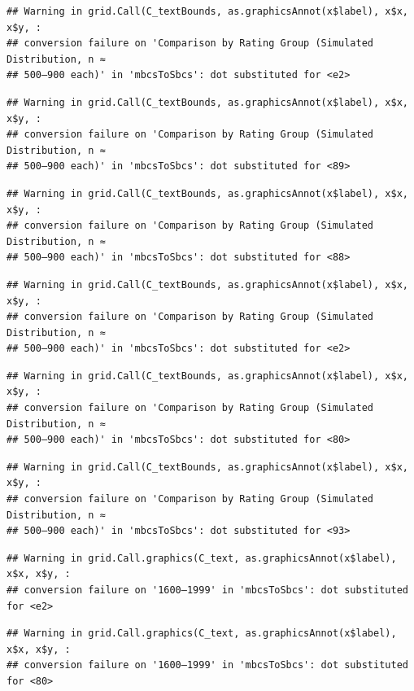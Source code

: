 \documentclass[
]{article}
\begin{document}
\begin{verbatim}
## Warning in grid.Call(C_textBounds, as.graphicsAnnot(x$label), x$x, x$y, :
## conversion failure on 'Comparison by Rating Group (Simulated Distribution, n ≈
## 500–900 each)' in 'mbcsToSbcs': dot substituted for <e2>
\end{verbatim}

\begin{verbatim}
## Warning in grid.Call(C_textBounds, as.graphicsAnnot(x$label), x$x, x$y, :
## conversion failure on 'Comparison by Rating Group (Simulated Distribution, n ≈
## 500–900 each)' in 'mbcsToSbcs': dot substituted for <89>
\end{verbatim}

\begin{verbatim}
## Warning in grid.Call(C_textBounds, as.graphicsAnnot(x$label), x$x, x$y, :
## conversion failure on 'Comparison by Rating Group (Simulated Distribution, n ≈
## 500–900 each)' in 'mbcsToSbcs': dot substituted for <88>
\end{verbatim}

\begin{verbatim}
## Warning in grid.Call(C_textBounds, as.graphicsAnnot(x$label), x$x, x$y, :
## conversion failure on 'Comparison by Rating Group (Simulated Distribution, n ≈
## 500–900 each)' in 'mbcsToSbcs': dot substituted for <e2>
\end{verbatim}

\begin{verbatim}
## Warning in grid.Call(C_textBounds, as.graphicsAnnot(x$label), x$x, x$y, :
## conversion failure on 'Comparison by Rating Group (Simulated Distribution, n ≈
## 500–900 each)' in 'mbcsToSbcs': dot substituted for <80>
\end{verbatim}

\begin{verbatim}
## Warning in grid.Call(C_textBounds, as.graphicsAnnot(x$label), x$x, x$y, :
## conversion failure on 'Comparison by Rating Group (Simulated Distribution, n ≈
## 500–900 each)' in 'mbcsToSbcs': dot substituted for <93>
\end{verbatim}

\begin{verbatim}
## Warning in grid.Call.graphics(C_text, as.graphicsAnnot(x$label), x$x, x$y, :
## conversion failure on '1600–1999' in 'mbcsToSbcs': dot substituted for <e2>
\end{verbatim}

\begin{verbatim}
## Warning in grid.Call.graphics(C_text, as.graphicsAnnot(x$label), x$x, x$y, :
## conversion failure on '1600–1999' in 'mbcsToSbcs': dot substituted for <80>
\end{verbatim}
\end{document}
